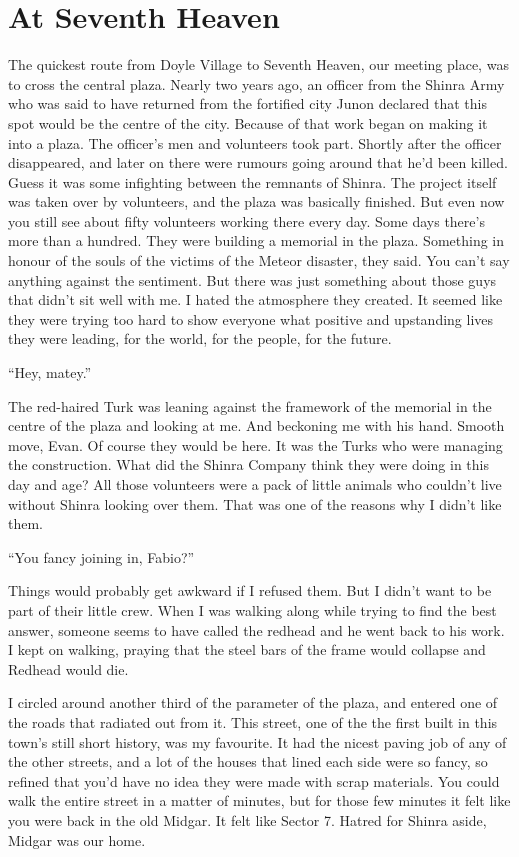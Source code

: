 \documentclass[oneside]{book}
\begin{document}
\chapter{At Seventh Heaven}
The quickest route from Doyle Village to Seventh Heaven, our meeting place, was to cross the central plaza. Nearly two years ago, an officer from the Shinra Army who was said to have returned from the fortified city Junon declared that this spot would be the centre of the city. Because of that work began on making it into a plaza. The officer’s men and volunteers took part. Shortly after the officer disappeared, and later on there were rumours going around that he’d been killed. Guess it was some infighting between the remnants of Shinra. The project itself was taken over by volunteers, and the plaza was basically finished. But even now you still see about fifty volunteers working there every day. Some days there’s more than a hundred. They were building a memorial in the plaza. Something in honour of the souls of the victims of the Meteor disaster, they said. You can’t say anything against the sentiment. But there was just something about those guys that didn’t sit well with me. I hated the atmosphere they created. It seemed like they were trying too hard to show everyone what positive and upstanding lives they were leading, for the world, for the people, for the future.

“Hey, matey.”

The red-haired Turk was leaning against the framework of the memorial in the centre of the plaza and looking at me. And beckoning me with his hand. Smooth move, Evan. Of course they would be here. It was the Turks who were managing the construction. What did the Shinra Company think they were doing in this day and age? All those volunteers were a pack of little animals who couldn’t live without Shinra looking over them. That was one of the reasons why I didn’t like them.

“You fancy joining in, Fabio?”

Things would probably get awkward if I refused them. But I didn’t want to be part of their little crew. When I was walking along while trying to find the best answer, someone seems to have called the redhead and he went back to his work. I kept on walking, praying that the steel bars of the frame would collapse and Redhead would die.

I circled around another third of the parameter of the plaza, and entered one of the roads that radiated out from it. This street, one of the the first built in this town’s still short history, was my favourite. It had the nicest paving job of any of the other streets, and a lot of the houses that lined each side were so fancy, so refined that you’d have no idea they were made with scrap materials. You could walk the entire street in a matter of minutes, but for those few minutes it felt like you were back in the old Midgar. It felt like Sector 7. Hatred for Shinra aside, Midgar was our home.
\end{document}
